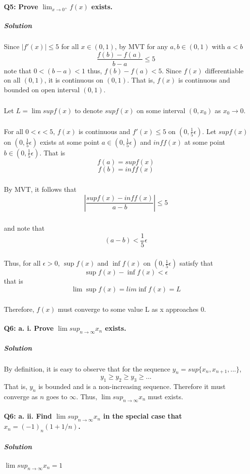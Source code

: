 \documentclass{article}
\begin{document}
\paragraph{Q5: Prove $\lim _{x\to0^+}{f(x)}$ exists.}
\subparagraph{Solution}
Since $|f'(x)| \leq 5$ for all $x \in (0,1)$, by MVT for any $a, b \in (0,1)$ with $a < b$
\begin{equation*} 
\frac{f(b) - f(a)}{ b - a} \leq 5
\end{equation*}
note that $0<(b-a) < 1$ thus, $f(b) - f(a) < 5$. Since $f(x)$ differentiable on all $(0,1)$, it is continuous on $(0,1)$. That is, $f(x)$ is continuous and bounded on open interval $(0,1)$. 
\subparagraph{}
Let $L = \lim sup f(x)$ to denote $sup f(x)$ on some interval $(0, x_0)$ as $x_0 \to 0$. 
\subparagraph{}
For all $ 0 < \epsilon < 5$, $f(x)$ is continuous and $f'(x) \leq 5$ on $(0, \frac {1}{5} \epsilon)$. Let $sup f(x)$ on $(0, \frac {1}{5} \epsilon)$ exists at some point $a \in (0, \frac {1}{5} \epsilon)$ and $inf f(x)$ at some point $b  \in (0, \frac {1}{5} \epsilon)$. That is
\begin {equation*}
f(a) = sup f(x)
\end{equation*}
\begin {equation*}
f(b) = inf f(x)
\end{equation*}
\subparagraph{}
By MVT, it follows that
\begin {equation*}
|\frac {sup f(x) - inf f(x)}{a - b} |\leq 5
\end {equation*}
\subparagraph{}
and note that 
\[(a - b) < \frac {1}{5} \epsilon\]
\subparagraph{}
Thus, for all $\epsilon > 0$, $\sup f(x)$ and $\inf f(x)$ on $(0, \frac{1}{5} \epsilon)$ satisfy that
\[ \sup f(x) - \inf f(x) < \epsilon\]
that is \[\lim \sup f(x) = lim \inf f(x) = L\]
\subparagraph{}
Therefore, $f(x)$ must converge to some value L as x approaches 0. 
\paragraph{Q6: a. i. Prove $\lim sup_{n\to\infty} x_n$ exists.}
\subparagraph{Solution} 
By definition, it is easy to observe that for the sequence $y_n = sup\{x_n, x_{n+1}, ...\}$, 
\[y_1 \geq y_2 \geq y_3 \geq ...\]
That is, $y_n$ is bounded and is a non-increasing sequence. Therefore it must converge as $n$ goes to $\infty$. Thus, $\lim sup_{n\to\infty}x_n$ must exists.
\paragraph{Q6: a. ii. Find $\lim sup_{n\to\infty} x_n$ in the special case that $x_n = (-1)_n (1+1/n)$.}
\subparagraph{Solution} 
$\lim sup_{n\to\infty} x_n = 1$
\end{document}
